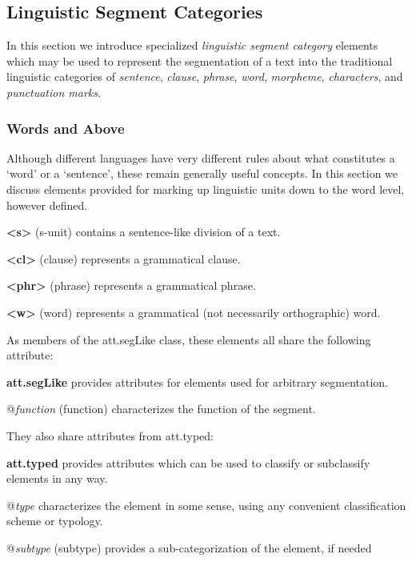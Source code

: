 \subsection[{Linguistic Segment Categories}]{Linguistic Segment Categories}\label{AILC}\par
In this section we introduce specialized \textit{linguistic segment category} elements which may be used to represent the segmentation of a text into the traditional linguistic categories of \textit{sentence}, \textit{clause}, \textit{phrase}, \textit{word}, \textit{morpheme}, \textit{characters}, and \textit{punctuation marks}.
\subsubsection[{Words and Above}]{Words and Above}\label{AILCW}\par
Although different languages have very different rules about what constitutes a ‘word’ or a ‘sentence’, these remain generally useful concepts. In this section we discuss elements provided for marking up linguistic units down to the word level, however defined. 
\begin{sansreflist}
  
\item [\textbf{<s>}] (s-unit) contains a sentence-like division of a text.
\item [\textbf{<cl>}] (clause) represents a grammatical clause.
\item [\textbf{<phr>}] (phrase) represents a grammatical phrase.
\item [\textbf{<w>}] (word) represents a grammatical (not necessarily orthographic) word.
\end{sansreflist}
\par
As members of the \textsf{att.segLike} class, these elements all share the following attribute: 
\begin{sansreflist}
  
\item [\textbf{att.segLike}] provides attributes for elements used for arbitrary segmentation.\hfil\\[-10pt]\begin{sansreflist}
    \item[@{\itshape function}]
  (function) characterizes the function of the segment.
\end{sansreflist}  
\end{sansreflist}
 They also share attributes from \textsf{att.typed}: 
\begin{sansreflist}
  
\item [\textbf{att.typed}] provides attributes which can be used to classify or subclassify elements in any way.\hfil\\[-10pt]\begin{sansreflist}
    \item[@{\itshape type}]
  characterizes the element in some sense, using any convenient classification scheme or typology.
    \item[@{\itshape subtype}]
  (subtype) provides a sub-categorization of the element, if needed
\end{sansreflist}  
\end{sansreflist}
